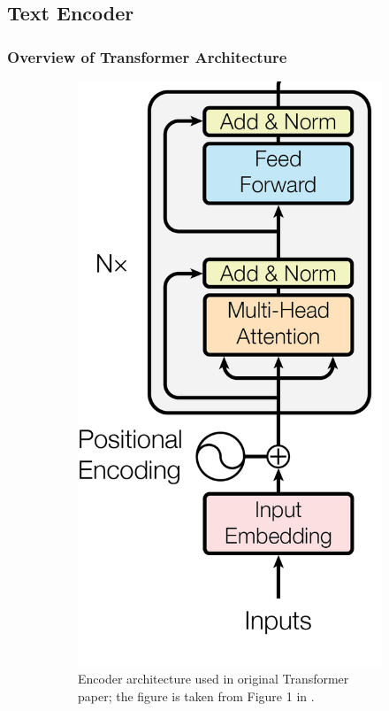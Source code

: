 \subsection{Text Encoder}

\subsubsection*{Overview of Transformer Architecture}
\begin{figure}[!htb]
\begin{subfigure}{0.5\textwidth}
    \centering
    \includegraphics[width=0.5\linewidth]{modeling/transformer.png}  
    \caption{Encoder architecture used in original Transformer paper; the figure is taken from Figure 1 in \cite{attentionAllYouNeed}.}
    \label{modeling.transformer.origEncoder}
\end{subfigure}
\hspace{5mm}
\begin{subfigure}{0.5\textwidth}
    \centering

\end{subfigure}
\end{figure}

